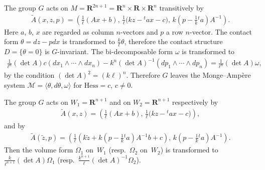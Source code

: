 \begin{Rem}
The group $G$ acts on $M = {\mathbf{R}}^{2n+1} = {\mathbf{R}}^n \times {\mathbf{R}} \times {\mathbf{R}}^n$ transitively by
\begin{gather*}
\widetilde{A}(x, z, p) = \left(\frac{1}{\ell}(Ax + b), \, \frac{1}{\ell}\big(kz - {}^t\!ax - c\big), \, k\left(p - \frac{1}{k}{}^t\!a\right)A^{-1}\right).
\end{gather*}
Here $a$, $b$, $x$ are regarded as column $n$-vectors and $p$ a row $n$-vector.
The contact form $\theta = dz - pdx$ is transformed to
$\frac{k}{\ell}\theta$, therefore
the contact structure $D=\{ \theta =0 \}$ is $G$-invariant.
The bi-decomposable form $\omega$ is transformed to
\begin{gather*}
\frac{1}{\ell^n}(\det A)c(dx_1\wedge \cdots \wedge dx_{n})
-
k^n(\det A)^{-1}(dp_1\wedge \cdots \wedge dp_{n}) = \frac{1}{\ell^n}(\det A)  \omega,
\end{gather*}
by the condition $(\det A)^2 = (k\ell)^n$.
Therefore $G$ leaves the Monge--Amp{\`e}re system ${\mathcal M} = \langle \theta, d\theta, \omega\rangle$
for ${\mathrm{Hess}} = c$, $c \not= 0$.

The group $G$ acts on $W_1 = {\mathbf{R}}^{n+1}$ and on $W_2={\mathbf{R}}^{n+1}$ respectively by
\begin{gather*}
\widetilde{A}(x, z) = \left(\frac{1}{\ell}(Ax + b), \, \frac{1}{\ell}\big(kz - {}^t\!ax - c\big)\right),
\end{gather*}
and by
\begin{gather*}
\widetilde{A}(\tilde{z}, p) = \left(\frac{1}{\ell}\left(k\tilde{z} + k\left(p - \frac{1}{k}{}^t\!a\right)A^{-1}b + c\right), \, k\left(p - \frac{1}{k}{}^t\!a\right)A^{-1}\right).
\end{gather*}
Then the volume form $\Omega_1$ on~$W_1$ (resp.~$\Omega_2$ on~$W_2$)
is transformed to $\frac{k}{\ell^{n+1}}(\det A)\Omega_1$ (resp.\ $\frac{k^{n+1}}{\ell}(\det A)^{-1}\Omega_2$).
\end{Rem}
